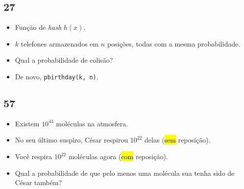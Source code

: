 \documentclass[
  11pt]{report}
\providecommand{\tightlist}{%
  \setlength{\itemsep}{0pt}\setlength{\parskip}{0pt}}
\begin{document}
\hypertarget{section-4}{%
\subsection*{27}\label{section-4}}

\begin{rmdbox}

\begin{itemize}
\item
  Função de \emph{hash} $h(x)$.
\item
  $k$ telefones armazenados em $n$ posições, todas com a mesma probabilidade.
\item
  Qual a probabilidade de colisão?
\end{itemize}

\end{rmdbox}

\begin{itemize}
\tightlist
\item
  De novo, \texttt{pbirthday(k,\ n)}.
\end{itemize}

\hypertarget{section-5}{%
\subsection*{57}\label{section-5}}

\begin{rmdbox}

\begin{itemize}
\item
  Existem $10^{44}$ moléculas na atmosfera.
\item
  No seu último suspiro, César respirou $10^{22}$ delas ({\hl{sem}} reposição).
\item
  Você respira $10^{22}$ moléculas agora ({\hl{com}} reposição).
\item
  Qual a probabilidade de que pelo menos uma molécula sua tenha sido de César também?
\end{itemize}

\end{rmdbox}
\end{document}
